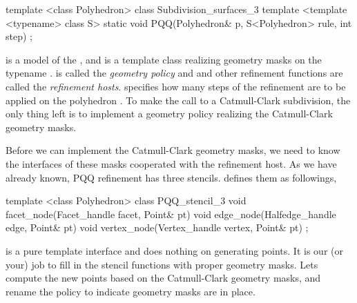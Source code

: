 \begin{ccExampleCode}
template <class Polyhedron>
class Subdivision_surfaces_3 {
  template <template <typename> class S>
  static void PQQ(Polyhedron& p, S<Polyhedron> rule, int step)
};
\end{ccExampleCode}

 is a model of the , and
 is a template class realizing geometry masks on the typename 
.  is called the
\emph{geometry policy} and  and other refinement 
functions are called the \emph{refinement hosts}. 
 specifies how many steps of the 
refinement are to be applied on the polyhedron . To make the call to
 a Catmull-Clark subdivision, the only thing left is to
implement a geometry policy realizing the Catmull-Clark geometry masks.

Before we can implement the Catmull-Clark geometry masks, we 
need to know the interfaces of these masks cooperated with
the refinement host. As we have already known, PQQ refinement has three
stencils.  defines them as followings,
\begin{ccExampleCode}
template <class Polyhedron>
class PQQ_stencil_3 {
  void facet_node(Facet_handle facet, Point& pt) {}
  void edge_node(Halfedge_handle edge, Point& pt) {}
  void vertex_node(Vertex_handle vertex, Point& pt) {}
};
\end{ccExampleCode}

 is a pure template interface and does nothing 
on generating points. It is our (or your) job to fill in the 
stencil functions with proper geometry masks. Lets compute the 
new points based on the Catmull-Clark geometry masks, and 
rename the policy to indicate geometry masks are in place.

